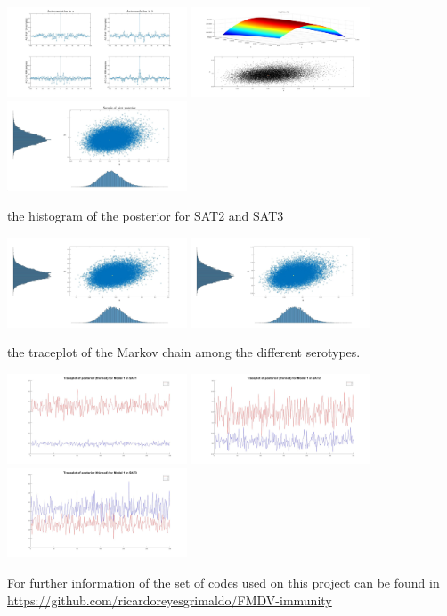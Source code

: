 \documentclass[11pt,letterpaper]{amsart}
\theoremstyle{plain}
\theoremstyle{definition}
\theoremstyle{remark}
\begin{document}
\begin{center}
\includegraphics[width=0.4\textwidth]{mcmchcfig1.jpg}
\includegraphics[width=0.4\textwidth]{mcmchcfig2.jpg}
\includegraphics[width=0.4\textwidth]{mcmchcfig4.jpg}
\end{center}
the histogram of the posterior for SAT2 and SAT3
\begin{center}
\includegraphics[width=0.4\textwidth]{mcmchcfig8.jpg}
\includegraphics[width=0.4\textwidth]{mcmchcfig12.jpg}
\end{center}
the traceplot of the Markov chain among the different serotypes.
\begin{center}
\includegraphics[width=0.4\textwidth]{traceplot1.jpg}
\includegraphics[width=0.4\textwidth]{traceplot2.jpg}
\includegraphics[width=0.4\textwidth]{traceplot3.jpg}
\end{center}
For further information of the set of codes used on this project can be found in 
\url{https://github.com/ricardoreyesgrimaldo/FMDV-immunity}
\end{document}
